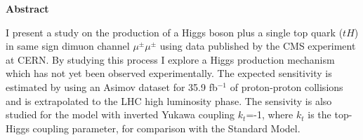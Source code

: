\thispagestyle{empty}
\vspace*{2.2cm}
\begin{center}
	\Large \textbf{Abstract}
\end{center} 
\vspace{1.5cm}


\begin{center}
	\justifying
I present a study on the production of a Higgs boson plus a single top quark ($tH$) in same sign dimuon channel $\mu^\pm \mu^\pm$ using data published by the CMS experiment at CERN. By studying this
process I explore a Higgs production mechanism which has not yet been observed
experimentally. The expected sensitivity is estimated by using an Asimov dataset for 35.9 fb$^{-1}$ of proton-proton collisions and is extrapolated to the LHC high luminosity phase.
The sensivity is also studied for the model with inverted Yukawa coupling $k_t$=-1, where $k_t$ is the top-Higgs coupling parameter, for comparison with the Standard Model.
\end{center}
